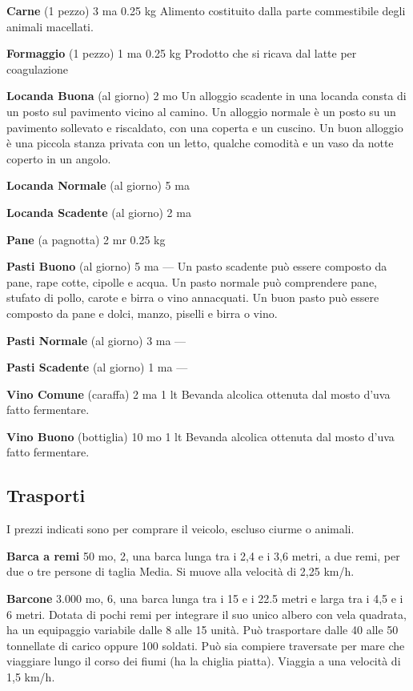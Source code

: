 \documentclass[a4paper,11pt,twoside,openany]{book}
\begin{document}
\textbf{Carne} (1 pezzo) 3 ma 0.25 kg Alimento costituito dalla parte commestibile degli animali macellati.

\textbf{Formaggio} (1 pezzo) 1 ma 0.25 kg Prodotto che si ricava dal latte per coagulazione

\textbf{Locanda Buona} (al giorno) 2 mo Un alloggio scadente in una locanda consta di un posto sul pavimento vicino al camino. Un alloggio normale è un posto su un pavimento sollevato e riscaldato, con una coperta e un cuscino. Un buon alloggio è una piccola stanza privata con un letto, qualche comodità e un vaso da notte coperto in un angolo.

\textbf{Locanda Normale} (al giorno) 5 ma

\textbf{Locanda Scadente} (al giorno) 2 ma

\textbf{Pane} (a pagnotta) 2 mr 0.25 kg

\textbf{Pasti Buono} (al giorno) 5 ma --- Un pasto scadente può essere composto da pane, rape cotte, cipolle e acqua. Un pasto normale può comprendere pane, stufato di pollo, carote e birra o vino annacquati. Un buon pasto può essere composto da pane e dolci, manzo, piselli e birra o vino.

\textbf{Pasti Normale} (al giorno) 3 ma ---

\textbf{Pasti Scadente} (al giorno) 1 ma ---

\textbf{Vino Comune} (caraffa) 2 ma 1 lt Bevanda alcolica ottenuta dal mosto d'uva fatto fermentare.

\textbf{Vino Buono} (bottiglia) 10 mo 1 lt Bevanda alcolica ottenuta dal mosto d'uva fatto fermentare.

\pagebreak

\subsection{Trasporti}

\label{trasporti}

I prezzi indicati sono per comprare il veicolo, escluso ciurme o animali.

\textbf{Barca a remi} 50 mo, 2, una barca lunga tra i 2,4 e i 3,6 metri, a due remi, per due o tre persone di taglia Media. Si muove alla velocità di 2,25 km/h.

\textbf{Barcone} 3.000 mo, 6, una barca lunga tra i 15 e i 22.5 metri e larga tra i 4,5 e i 6 metri. Dotata di pochi remi per integrare il suo unico albero con vela quadrata, ha un equipaggio variabile dalle 8 alle 15 unità. Può trasportare dalle 40 alle 50 tonnellate di carico oppure 100 soldati. Può sia compiere traversate per mare che viaggiare lungo il corso dei fiumi (ha la chiglia piatta). Viaggia a una velocità di 1,5 km/h.
\end{document}

